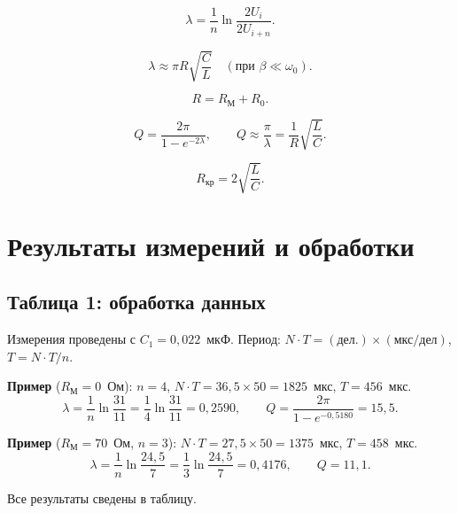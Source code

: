 \begin{equation}
\lambda = \frac{1}{n}\ln\frac{2U_i}{2U_{i+n}}.
\end{equation}

\begin{equation}
\lambda \approx \pi R \sqrt{\frac{C}{L}} \quad (\text{при } \beta \ll \omega_0).
\end{equation}

\begin{equation}
R = R_\text{М} + R_0.
\end{equation}

\begin{equation}
Q = \frac{2\pi}{1 - e^{-2\lambda}}, \qquad
Q \approx \frac{\pi}{\lambda} = \frac{1}{R}\sqrt{\frac{L}{C}}.
\end{equation}

\begin{equation}
R_{\text{кр}} = 2\sqrt{\frac{L}{C}}.
\end{equation}

\section{Результаты измерений и обработки}

\subsection{Таблица 1: обработка данных}

Измерения проведены с $C_1 = 0{,}022$~мкФ. Период: $N \cdot T = (\text{дел.}) \times (\text{мкс/дел})$, $T = N\cdot T / n$.

\textbf{Пример} ($R_\text{М} = 0$~Ом): $n = 4$, $N \cdot T = 36{,}5 \times 50 = 1825$~мкс, $T = 456$~мкс.
\[
\lambda = \frac{1}{n}\ln\frac{31}{11} = \frac{1}{4}\ln\frac{31}{11} = 0{,}2590, \qquad
Q = \frac{2\pi}{1 - e^{-0{,}5180}} = 15{,}5.
\]

\textbf{Пример} ($R_\text{М} = 70$~Ом, $n = 3$): $N \cdot T = 27{,}5 \times 50 = 1375$~мкс, $T = 458$~мкс.
\[
\lambda = \frac{1}{n}\ln\frac{24{,}5}{7} = \frac{1}{3}\ln\frac{24{,}5}{7} = 0{,}4176, \qquad Q = 11{,}1.
\]

Все результаты сведены в таблицу.

